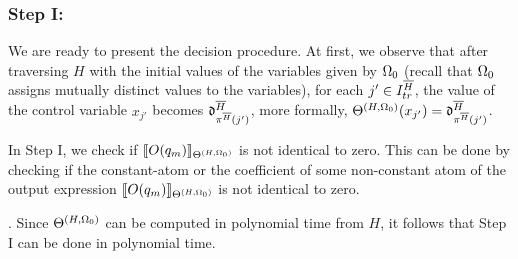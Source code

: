 \subsubsection{Step I:} 
We are ready to present the decision procedure. At first, we observe that  after traversing $H$ with the initial values of the variables given by $\Omega_0$ (recall that $\Omega_0$ assigns mutually distinct values to the variables), for each $j' \in I^{\overline{H}}_{tr}$, the value of the control variable $x_{j'}$ becomes $\mathfrak{d}^{\overline{H}}_{\pi^{\overline{H}}(j')}$,  more formally, $\Theta^{(H,\Omega_0)}(x_{j'})=\mathfrak{d}^{\overline{H}}_{\pi^{\overline{H}}(j')}$.

In Step I, we check if $\llbracket O(q_m)\rrbracket_{\Theta^{(H,\Omega_0)}}$ is not identical to zero.
This can be done by checking if the constant-atom or the coefficient of some non-constant atom of the output expression $\llbracket O(q_m)\rrbracket_{\Theta^{(H,\Omega_0)}}$ is not identical to zero.
%
\smallskip\\
\bigskip

. Since $\Theta^{(H,\Omega_0)}$ can be computed in polynomial time from $H$, it follows that Step I can be done in polynomial time.

